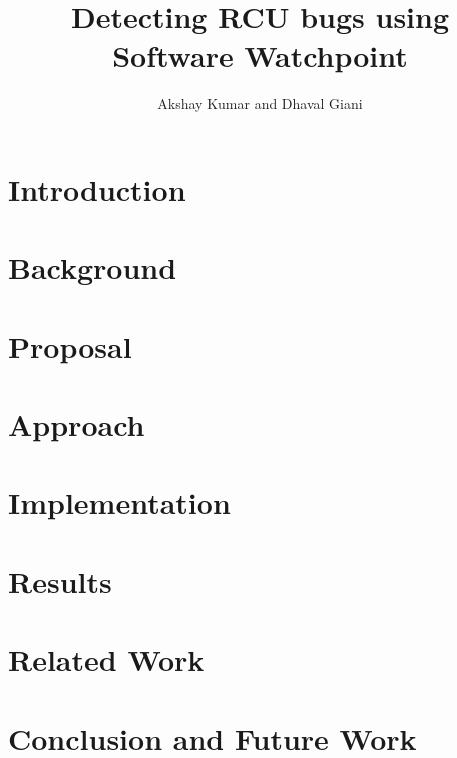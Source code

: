 \documentclass[10pt,twocolumn]{article}
\begin{document}
\title{\bf Detecting RCU bugs using Software Watchpoint}
\author{Akshay Kumar and Dhaval Giani }
\date{}
\maketitle
\thispagestyle{empty}

\lstset{language=C,basicstyle=\ttfamily,tabsize=4, columns=fullflexible}
\begin{abstract}

\end{abstract}

\section{Introduction}\label{sec:intro}


\section{Background}\label{sec:back}


\section{Proposal}\label{sec:proposal}


\section{Approach}\label{sec:appr}


\section{Implementation}\label{sec:impl}


\section{Results}\label{sec:results}


\section{Related Work}\label{sec:related}


\section{Conclusion and Future Work}\label{sec:conclusions}

\end{document}
